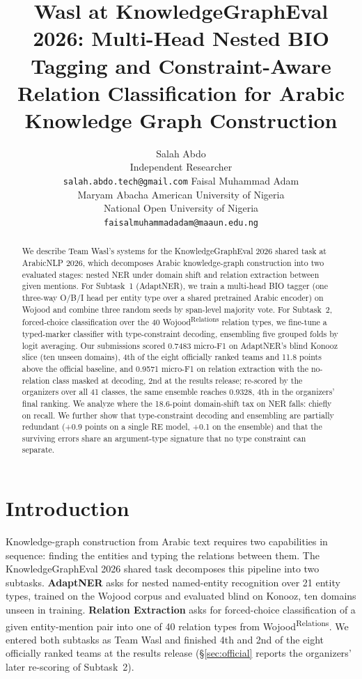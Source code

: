 \documentclass[11pt]{article}
\title{Wasl at KnowledgeGraphEval 2026: Multi-Head Nested BIO Tagging and
  Constraint-Aware Relation Classification for Arabic Knowledge Graph
  Construction}
\author{Salah Abdo \\
  Independent Researcher \\
  \texttt{salah.abdo.tech@gmail.com} \And
  Faisal Muhammad Adam \\
  Maryam Abacha American University of Nigeria \\
  National Open University of Nigeria \\
  \texttt{faisalmuhammadadam@maaun.edu.ng}}
\newcommand{\WojoodRel}{Wojood\textsuperscript{Relations}}
\begin{document}
\maketitle

\begin{abstract}
We describe Team Wasl's systems for the KnowledgeGraphEval 2026 shared
task at ArabicNLP 2026, which decomposes Arabic knowledge-graph
construction into two evaluated stages: nested NER under domain shift and
relation extraction between given mentions. For Subtask~1 (AdaptNER), we
train a multi-head BIO tagger (one three-way O/B/I head per entity type
over a shared pretrained Arabic encoder) on Wojood and combine three
random seeds by span-level majority vote. For Subtask~2, forced-choice
classification over the 40 \WojoodRel{} relation types, we fine-tune a
typed-marker classifier with type-constraint decoding, ensembling five
grouped folds by logit averaging. Our submissions scored 0.7483 micro-F1 on
AdaptNER's blind Konooz slice (ten unseen domains), 4th of the eight
officially ranked teams and 11.8 points above the official baseline, and
0.9571 micro-F1 on relation extraction with the no-relation class masked
at decoding, 2nd at the results release; re-scored by the organizers
over all 41 classes, the same ensemble reaches 0.9328, 4th in the
organizers' final ranking. We analyze where
the 18.6-point domain-shift tax on NER falls: chiefly on recall. We
further show that type-constraint decoding and ensembling are partially
redundant (+0.9 points on a single RE model, +0.1 on the ensemble) and
that the surviving errors share an argument-type signature that no type
constraint can separate.
\end{abstract}

\section{Introduction}

Knowledge-graph construction from Arabic text requires two capabilities in
sequence: finding the entities and typing the relations between them. The
KnowledgeGraphEval 2026 shared task \citep{JHJ2026} decomposes this
pipeline into two subtasks. \textbf{AdaptNER} asks for nested
named-entity recognition over 21 entity types, trained on the Wojood
corpus and evaluated blind on Konooz, ten domains unseen in training.
\textbf{Relation Extraction}
asks for forced-choice classification of a given entity-mention pair into
one of 40 relation types from \WojoodRel{}. We entered both subtasks
as Team Wasl and finished 4th and 2nd of the eight officially ranked
teams at the results release (\S\ref{sec:official} reports the
organizers' later re-scoring of Subtask~2).
\end{document}
